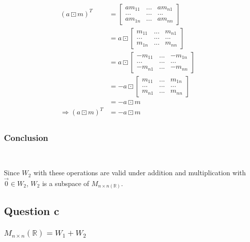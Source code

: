 \documentclass{article}
\def\R{\mathbb{R}}
\begin{document}
~

\begin{equation}
\tag{1.2.3}
\begin{split}
(a \boxdot m)^T &= \begin{bmatrix}
am_{11}&...&am_{n1}\\
...&...&...\\
am_{1n}&...&am_{nn}
\end{bmatrix}\\
&= a \boxdot \begin{bmatrix}
m_{11}&...&m_{n1}\\
...&...&...\\
m_{1n}&...&m_{nn}
\end{bmatrix}\\
&= a \boxdot \begin{bmatrix}
-m_{11}&...&-m_{1n}\\
...&...&...\\
-m_{n1}&...&-m_{nn}
\end{bmatrix}\\
&= -a \boxdot \begin{bmatrix}
m_{11}&...&m_{1n}\\
...&...&...\\
m_{n1}&...&m_{nn}
\end{bmatrix}\\
&= -a \boxdot m\\
\Rightarrow (a \boxdot m)^T &= -a \boxdot m\\
\end{split}
\end{equation}

\subsubsection{Conclusion}

~

Since $W_2$ with these operations are valid under addition and multiplication with $\overrightarrow{0} \in W_2$, $W_2$ is a subspace of $M_{n\times n(\R)}$.

\subsection{Question c}

\subsubsection{$M_{n\times n}(\R)=W_1+W_2$}
\end{document}
